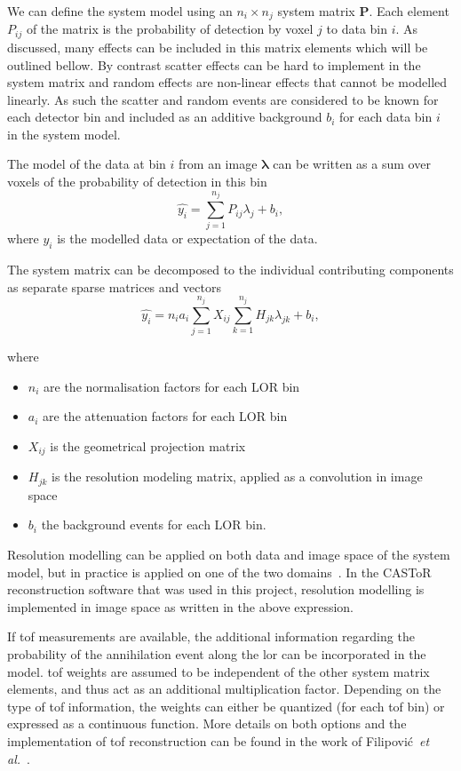 We can define the system model using an $n_i \times n_j$ system matrix $\bm{P}$. Each element $P_{ij}$ of the matrix is the probability of detection by voxel $j$ to data bin $i$. 
As discussed, many effects can be included in this matrix elements which will be outlined bellow. By contrast scatter effects can be hard to implement in the system matrix and random effects are non-linear effects that cannot be modelled linearly. As such the scatter and random events are considered to be known for each detector bin and included as an additive background $b_i$ for each data bin $i$ in the system model.

The model of the data at bin $i$ from an image $\bm{\lambda}$ can be written as a sum over voxels of the probability of detection in this bin 
\begin{equation}
   \hat{y_i} = \sum_{j=1}^{n_j} P_{ij} \lambda_j + b_i ,
   \label{eqn:system_model}
\end{equation}
where $\hat{y_i}$ is the modelled data or expectation of the data.

The system matrix can be decomposed to the individual contributing components as separate sparse matrices and vectors
\begin{equation}
   \hat{y_i} = n_i a_i \sum_{j=1}^{n_j} X_{ij} \sum_{k=1}^{n_j} H_{jk} \lambda_{jk} + b_i ,
\end{equation}

where
\begin{itemize}
    \item $n_i$ are the normalisation factors for each LOR bin
    \item $a_i$ are the attenuation factors for each LOR bin
    \item $X_{ij}$ is the geometrical projection matrix
    \item $H_{jk}$ is the resolution modeling matrix, applied as a convolution in image space
    \item $b_i$ the background events for each LOR bin.
\end{itemize}
%
Resolution modelling can be applied on both data and image space of the system model, but in practice is applied on one of the two domains~\cite{Stute2013}. In the CASToR reconstruction software that was used in this project, resolution modelling is implemented in image space as written in the above expression.

If \gls{tof} measurements are available, the additional information regarding the probability of the annihilation event along the \gls{lor} can be incorporated in the model. \Gls{tof} weights are assumed to be independent of the other system matrix elements, and thus act as an additional multiplication factor. Depending on the type of \gls{tof} information, the weights can either be quantized (for each \gls{tof} bin) or expressed as a continuous function. More details on both options and the implementation of \gls{tof} reconstruction can be found in the work of Filipović~\textit{et al.}~\cite{Filipovic_2019}. 
%
